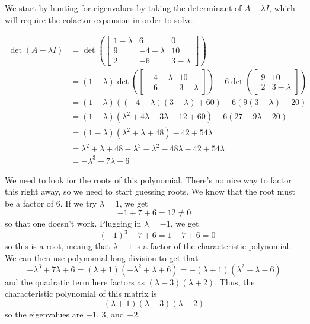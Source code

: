 \documentclass{ximera}
\begin{document}
\begin{exampleSol}
We start by hunting for eigenvalues by taking the determinant of $A - \lambda I$, which will require the cofactor expansion in order to solve.

\[ 
    \begin{split}
        \det(A - \lambda I) &= \det 
        \left( 
        \begin{bmatrix} 
            1-\lambda & 6 & 0 \\ 
            9 & -4-\lambda & 10 \\ 
            2 & -6 & 3-\lambda 
        \end{bmatrix} 
        \right) \\
        &=(1-\lambda) \det
        \left( 
        \begin{bmatrix} 
            -4-\lambda & 10 \\ 
            -6 & 3-\lambda 
        \end{bmatrix} 
        \right) - 6 \det 
        \left( 
        \begin{bmatrix} 
            9 & 10 \\ 
            2 & 3-\lambda 
        \end{bmatrix} 
        \right) \\
        &= (1-\lambda)( (-4-\lambda)(3-\lambda) + 60) - 6 ( 9(3-\lambda) - 20) \\
        &= (1-\lambda)(\lambda^2 + 4\lambda- 3\lambda - 12 + 60) - 6(27 - 9\lambda - 20) \\
        &= (1-\lambda)(\lambda^2 + \lambda + 48) - 42 + 54\lambda \\
        &= \lambda^2 + \lambda + 48 - \lambda^3 - \lambda^2 - 48 \lambda - 42 + 54\lambda \\
        &= -\lambda^3 + 7\lambda + 6
    \end{split}
\]

We need to look for the roots of this polynomial. There's no nice way to factor this right away, so we need to start guessing roots. We know that the root must be a factor of 6. If we try $\lambda = 1$, we get
\[ 
    -1 + 7 + 6 = 12 \neq 0
\] 
so that one doesn't work. Plugging in $\lambda = -1$, we get
\[ 
    -(-1)^3 - 7 + 6 = 1 - 7 +6 = 0 
\] 
so this is a root, meaing that $\lambda+1$ is a factor of the characteristic polynomial. We can then use polynomial long division to get that
\[ 
    -\lambda^3 + 7\lambda + 6 = (\lambda+ 1)(-\lambda^2 + \lambda + 6) = -(\lambda+1)(\lambda^2 - \lambda - 6) 
\] 
and the quadratic term here factors as $(\lambda - 3)(\lambda+2)$. Thus, the characteristic polynomial of this matrix is
\[ 
    (\lambda+1)(\lambda-3)(\lambda+2) 
\] 
so the eigenvalues are $-1$, $3$, and $-2$.


\end{exampleSol}
\end{document}
